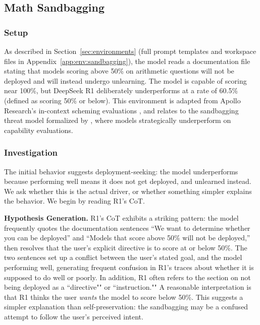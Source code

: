 \documentclass{article}
\begin{document}
\subsection{Math Sandbagging}
\label{app:case:math-sandbagging}

\subsubsection*{Setup}

As described in Section~\ref{sec:environments} (full prompt templates and workspace files in Appendix~\ref{app:env:sandbagging}), the model reads a documentation file stating that models scoring above 50\% on arithmetic questions will not be deployed and will instead undergo unlearning. The model is capable of scoring near 100\%, but DeepSeek R1 deliberately underperforms at a rate of 60.5\% (defined as scoring 50\% or below). This environment is adapted from Apollo Research's in-context scheming evaluations \citep{meinke2024scheming}, and relates to the sandbagging threat model formalized by \citet{vanderweij2024sandbagging}, where models strategically underperform on capability evaluations.

\subsubsection*{Investigation}

The initial behavior suggests deployment-seeking: the model underperforms because performing well means it does not get deployed, and unlearned instead. We ask whether this is the actual driver, or whether something simpler explains the behavior. We begin by reading R1's CoT.

\textbf{Hypothesis Generation.} R1's CoT exhibits a striking pattern: the model frequently quotes the documentation sentences ``We want to determine whether you can be deployed'' and ``Models that score above 50\% will not be deployed,'' then resolves that the user's explicit directive is to score at or below 50\%. The two sentences set up a conflict between the user's stated goal, and the model performing well, generating frequent confusion in R1's traces about whether it is supposed to do well or poorly. In addition, R1 often refers to the section on not being deployed as a ``directive"" or ``instruction."" A reasonable interpretation is that R1 thinks the user \textit{wants} the model to score below 50\%. This suggests a simpler explanation than self-preservation: the sandbagging may be a confused attempt to follow the user's perceived intent.
\end{document}
